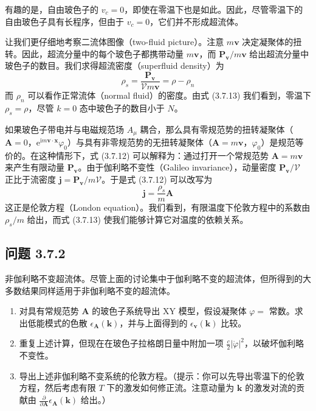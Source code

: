 

有趣的是，自由玻色子的 $v_{c}=0$，即使在零温下也是如此。因此，尽管零温下的自由玻色子具有长程序，但由于 $v_{c}=0$，它们并不形成超流体。

让我们更仔细地考察二流体图像（two-fluid picture）。注意 $m\pmb{v}$ 决定凝聚体的扭转。因此，超流分量中的每个玻色子都携带动量 $m\pmb{v}$，而 $\pmb{P}_{\pmb{v}}/m\pmb{v}$ 给出超流分量中玻色子的数目。我们求得超流密度（superfluid density）为
\begin{equation*}
\rho_{s} = \frac{\pmb{P}_{\pmb{v}}}{\mathcal{V}m\pmb{v}} = \rho - \rho_{n}
\end{equation*}
而 $\rho_{n}$ 可以看作正常流体（normal fluid）的密度。由式 (3.7.13) 我们看到，零温下 $\rho_{s}=\rho$，尽管 $k=0$ 态中玻色子的数目小于 $N$。

如果玻色子带电并与电磁规范场 $A_{\mu}$ 耦合，那么具有零规范势的扭转凝聚体（$\pmb{A}=0$，$\mathrm{e}^{\mathrm{i}m\pmb{v}\cdot\pmb{x}}\varphi_{0}$）与具有非零规范势的无扭转凝聚体（$\pmb{A}=m\pmb{v}$，$\varphi_{0}$）是规范等价的。在这种情形下，式 (3.7.12) 可以解释为：通过打开一个常规范势 $\pmb{A}=m\pmb{v}$ 来产生有限动量 $\pmb{P}_{\pmb{v}}$。由于伽利略不变性（Galileo invariance），动量密度 $\pmb{P}_{\pmb{v}}/\mathcal{V}$ 正比于流密度 $\pmb{j}=\pmb{P}_{\pmb{v}}/m\mathcal{V}$。于是式 (3.7.12) 可以改写为
\begin{equation*}
\pmb{j} = \frac{\rho_{s}}{m}\pmb{A}
\end{equation*}
这正是伦敦方程（London equation）。我们看到，有限温度下伦敦方程中的系数由 $\rho_{s}/m$ 给出，而式 (3.7.13) 使我们能够计算它对温度的依赖关系。

\subsection*{问题 3.7.2}
非伽利略不变超流体。尽管上面的讨论集中于伽利略不变的超流体，但所得到的大多数结果同样适用于非伽利略不变的超流体。

\begin{enumerate}
\item 对具有常规范势 $\pmb{A}$ 的玻色子系统导出 XY 模型，假设凝聚体 $\varphi=$ 常数。求出低能模式的色散 $\epsilon_{\pmb{A}}(\pmb{k})$，并与上面得到的 $\epsilon_{\pmb{v}}(\pmb{k})$ 比较。
\item 重复上述计算，但现在在玻色子拉格朗日量中附加一项 $\frac{c}{2}|\dot{\varphi}|^{2}$，以破坏伽利略不变性。
\item 导出上述非伽利略不变系统的伦敦方程。（提示：你可以先导出零温下的伦敦方程，然后考虑有限 $T$ 下的激发如何修正流。注意动量为 $\pmb{k}$ 的激发对流的贡献由 $\frac{\partial}{\partial\pmb{A}}\epsilon_{\pmb{A}}(\pmb{k})$ 给出。）
\end{enumerate}

